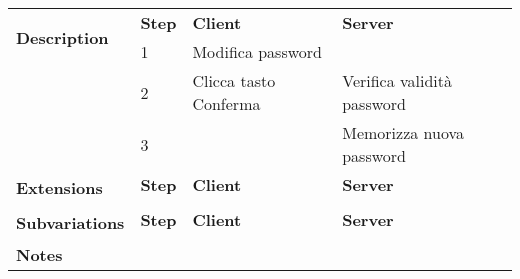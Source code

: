 \begin{table}[H]
\begin{tabularx}{\linewidth}{|l|X|X|X|}
        \hline \multirow{2}{*}{\textbf{Description}} & \textbf{Step}                                                                     &
        \textbf{Client}                              & \textbf{Server}                                                                                                                        \\
        \cline{2-4}                                  & 1                                                                                 & Modifica password     &                            \\
        \cline{2-4}                                  & 2                                                                                 & Clicca tasto Conferma & Verifica validità password \\
        \cline{2-4}                                  & 3                                                                                 &                       & Memorizza nuova password   \\
        \hline \multirow{2}{*}{\textbf{Extensions}}  & \textbf{Step}                                                                     &
        \textbf{Client}                              & \textbf{Server}                                                                                                                        \\
        \cline{2-4}                                  &                                                                                   &                       &                            \\
        \hline
        \multirow{2}{*}{\textbf{Subvariations}}      & \textbf{Step}                                                                     & \textbf{Client}       & \textbf{Server}            \\

        \cline{2-4}                                  &                                                                                   &                       &                            \\
        \hline \textbf{Notes}                        & \multicolumn{3}{l|}{}                                                                                                                  \\
        \hline
    \end{tabularx}

\end{table}

